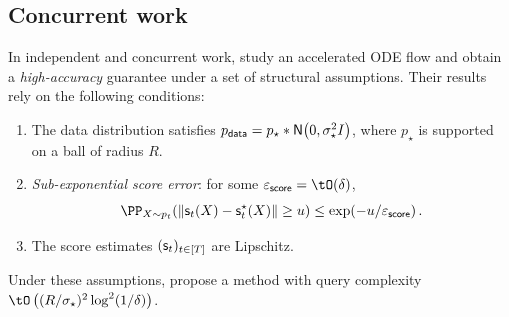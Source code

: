 
\subsection{Concurrent work}\label{sec:concurrent}
In independent and concurrent work, \citet{gatmiry2026high} study an accelerated ODE flow and  obtain a \emph{high-accuracy} guarantee under a set of structural assumptions.  Their results rely on the following conditions:
\begin{enumerate}[leftmargin=3em]
\item[(A1)] The data distribution satisfies $\pdata = p_\star * \normal{0,\sigma_\star^2 I}$, where $p_\star$ is supported on a ball of radius $R$.
\item[(A2)] \emph{Sub-exponential score error}: for some $\epssc = \tO(\delta)$,
\[
\PP_{X \sim p_t}\!\left(\nrm{\scf_t(X) - \scfs_t(X)} \ge u\right) \le \exp(-u/\epssc)\,.
\]
\item[(A3)] The score estimates $(\mathsf{s}_t)_{t\in [T]}$ are Lipschitz.
\end{enumerate}
Under these assumptions, \citet{gatmiry2026high} propose a method with query complexity $\tO\left((R/\sigma_\star)^2 \log^2(1/\delta)\right)$.

